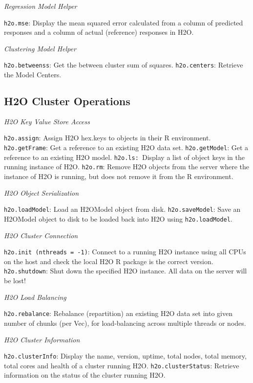 {{{{\medskip
\emph{Regression Model Helper}\par
{\texttt{h2o.mse}}: Display the mean squared error calculated from a column of predicted responses and a column of actual (reference) responses in H2O. 

\medskip
\emph{Clustering Model Helper}\par
{\texttt{h2o.betweenss}}: Get the between cluster sum of squares. 
{\texttt{h2o.centers}}: Retrieve the Model Centers. 

\subsection{H2O Cluster Operations}
\medskip
\emph{H2O Key Value Store Access}\par
{\texttt{h2o.assign}}: Assign H2O hex.keys to objects in their R environment. 
{\texttt{h2o.getFrame}}: Get a reference to an existing H2O data set.  
{\texttt{h2o.getModel}}: Get a reference to an existing H2O model.  
{\texttt{h2o.ls: }}Display a list of object keys in the running instance of H2O.  
{\texttt{h2o.rm}}: Remove H2O objects from the server where the instance of H2O is running, but does not remove it from the R environment. 

\medskip
\emph{H2O Object Serialization}\par
{\texttt{h2o.loadModel}}: Load an H2OModel object from disk. 
{\texttt{h2o.saveModel}}: Save an H2OModel object to disk to be loaded back into H2O using {\texttt{h2o.loadModel}}. 

\medskip
\emph{H2O Cluster Connection}\par
{\texttt{h2o.init (nthreads = -1)}}: Connect to a running H2O instance using all CPUs on the host and check the local H2O R package is the correct version. 
{\texttt{h2o.shutdown}}: Shut down the specified H2O instance. All data on the server will be lost! 

\medskip
\emph{H2O Load Balancing}\par
{\texttt{h2o.rebalance}}: Rebalance (repartition) an existing H2O data set into given number of chunks (per Vec), for load-balancing across multiple threads or nodes.  %

\medskip
\emph{H2O Cluster Information}\par
{\texttt{h2o.clusterInfo}}: Display the name, version, uptime, total nodes, total memory, total cores and health of a cluster running H2O. 
{\texttt{h2o.clusterStatus}}: Retrieve information on the status of the cluster running H2O. 

}}}}
